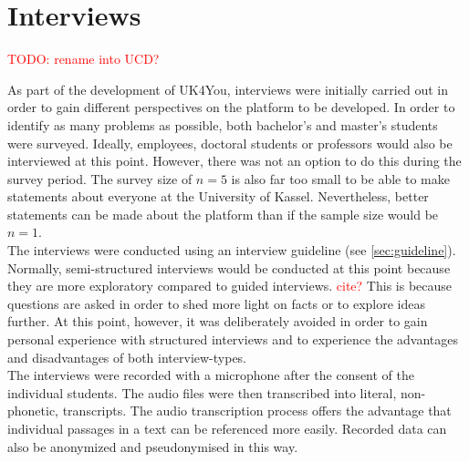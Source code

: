 \section{Interviews}
\textcolor{red}{TODO: rename into UCD?}

As part of the development of UK4You, interviews were initially carried out in order to gain different perspectives on the platform to be developed.
In order to identify as many problems as possible, both bachelor's and master's students were surveyed.
Ideally, employees, doctoral students or professors would also be interviewed at this point.
However, there was not an option to do this during the survey period.
The survey size of $n=5$ is also far too small to be able to make statements about everyone at the University of Kassel.
Nevertheless, better statements can be made about the platform than if the sample size would be $n=1$.\\

The interviews were conducted using an interview guideline (see \autoref{sec:guideline}).
Normally, semi-structured interviews would be conducted at this point because they are more exploratory compared to guided interviews. \textcolor{red}{cite?}
This is because questions are asked in order to shed more light on facts or to explore ideas further.
At this point, however, it was deliberately avoided in order to gain personal experience with structured interviews and to experience the advantages and disadvantages of both interview-types.\\

The interviews were recorded with a microphone after the consent of the individual students.
The audio files were then transcribed into literal, non-phonetic, transcripts.
The audio transcription process offers the advantage that individual passages in a text can be referenced more easily.
Recorded data can also be anonymized and pseudonymised in this way.
